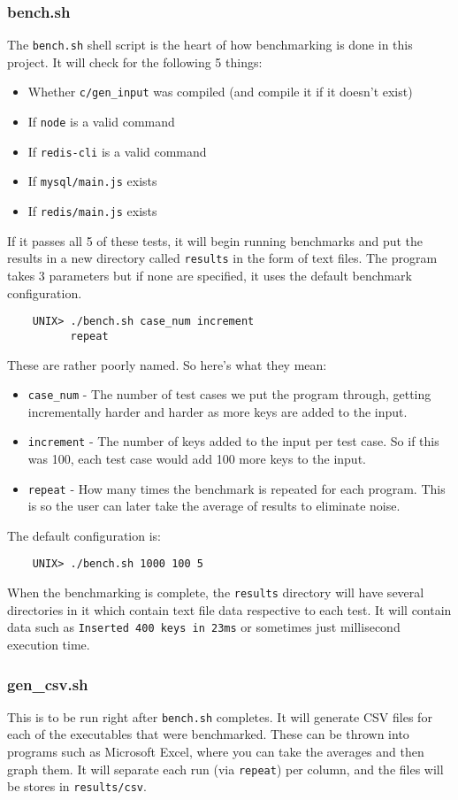 \documentclass[letterpaper, 10 pt, conference]{ieeeconf}
\begin{document}
\subsubsection{bench.sh}
The \texttt{bench.sh} shell script is the heart of how benchmarking is done in this project. It will check for the following 5 things:
\begin{itemize}
    \item Whether  \texttt{c/gen\_input} was compiled (and compile it if it doesn't exist)
    \item If \texttt{node} is a valid command
    \item If \texttt{redis-cli} is a valid command
    \item If \texttt{mysql/main.js} exists
    \item If \texttt{redis/main.js} exists
\end{itemize}
If it passes all 5 of these tests, it will begin running benchmarks and put the results in a new directory called \texttt{results} in the form of text files. The program takes 3 parameters but if none are specified, it uses the default benchmark configuration.
\begin{verbatim}
    UNIX> ./bench.sh case_num increment 
          repeat
\end{verbatim}
These are rather poorly named. So here's what they mean:
\begin{itemize}
    \item \texttt{case\_num} - The number of test cases we put the program through, getting incrementally harder and harder as more keys are added to the input.
    \item \texttt{increment} - The number of keys added to the input per test case. So if this was 100, each test case would add 100 more keys to the input.
    \item \texttt{repeat} - How many times the benchmark is repeated for each program. This is so the user can later take the average of results to eliminate noise.
\end{itemize}
The default configuration is:
\begin{verbatim}
    UNIX> ./bench.sh 1000 100 5
\end{verbatim}
When the benchmarking is complete, the \texttt{results} directory will have several directories in it which contain text file data respective to each test. It will contain data such as \texttt{Inserted 400 keys in 23ms} or sometimes just millisecond execution time.\\
\subsubsection{gen\_csv.sh}
This is to be run right after \texttt{bench.sh} completes. It will generate CSV files for each of the executables that were benchmarked. These can be thrown into programs such as Microsoft Excel, where you can take the averages and then graph them. It will separate each run (via \texttt{repeat}) per column, and the files will be stores in \texttt{results/csv}.
\end{document}
